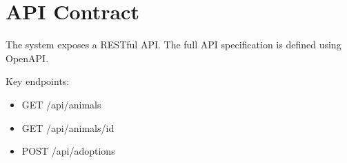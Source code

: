 \section{API Contract}

The system exposes a RESTful API.
The full API specification is defined using OpenAPI.

Key endpoints:
\begin{itemize}
  \item GET /api/animals
  \item GET /api/animals/{id}
  \item POST /api/adoptions
\end{itemize}
